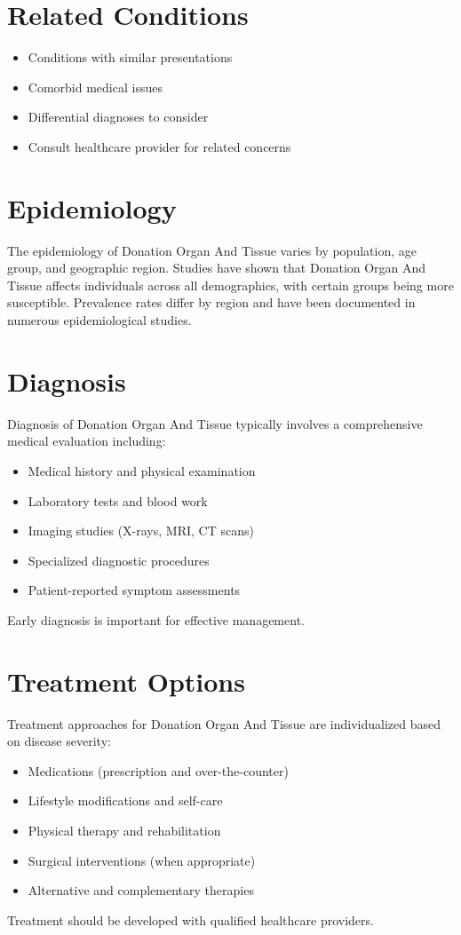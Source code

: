 \section*{Related Conditions}
\begin{itemize}
  \item Conditions with similar presentations
  \item Comorbid medical issues
  \item Differential diagnoses to consider
  \item Consult healthcare provider for related concerns
\end{itemize}

\section*{Epidemiology}
The epidemiology of Donation Organ And Tissue varies by population, age group, and geographic region. Studies have shown that Donation Organ And Tissue affects individuals across all demographics, with certain groups being more susceptible. Prevalence rates differ by region and have been documented in numerous epidemiological studies.

\section*{Diagnosis}
Diagnosis of Donation Organ And Tissue typically involves a comprehensive medical evaluation including:
\begin{itemize}
  \item Medical history and physical examination
  \item Laboratory tests and blood work
  \item Imaging studies (X-rays, MRI, CT scans)
  \item Specialized diagnostic procedures
  \item Patient-reported symptom assessments
\end{itemize}
Early diagnosis is important for effective management.

\section*{Treatment Options}
Treatment approaches for Donation Organ And Tissue are individualized based on disease severity:
\begin{itemize}
  \item Medications (prescription and over-the-counter)
  \item Lifestyle modifications and self-care
  \item Physical therapy and rehabilitation
  \item Surgical interventions (when appropriate)
  \item Alternative and complementary therapies
\end{itemize}
Treatment should be developed with qualified healthcare providers.

